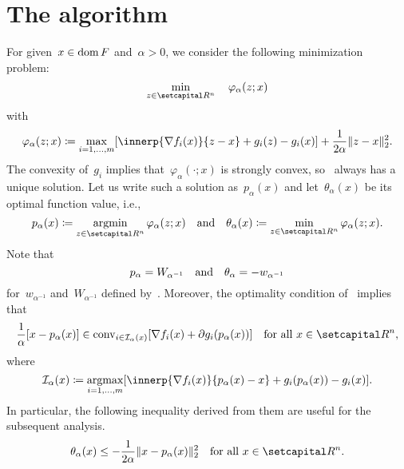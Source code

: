 \documentclass[../main]{subfiles}
\begin{document}
\section{The algorithm} 
For given~$x \in \operatorname{dom} F$ and~$\alpha > 0$, we consider the following minimization problem:
\begin{equation} \label{eq:pgm_subproblem}
    \min_{z \in \setR^n} \quad \varphi_\alpha(z; x)
\end{equation}
with
\begin{equation} \label{eq:pgm_obj}
    \varphi_\alpha(z; x) \coloneqq \max_{i = 1, \dots, m} [ \innerp{\nabla f_i(x)}{z - x} + g_i(z) - g_i(x) ] + \frac{1}{2 \alpha} \norm{ z - x }_2^2
.\end{equation}
The convexity of~$g_i$ implies that~$\varphi_\alpha(\cdot; x)$ is strongly convex, so~ always has a unique solution.
Let us write such a solution as~$p_\alpha(x)$ and let~$\theta_\alpha(x)$ be its optimal function value, i.e.,
\begin{equation} \label{eq:pgm_optimal_function}
    p_\alpha(x) \coloneqq \argmin_{z \in \setR^n} \varphi_\alpha(z; x) \eqand \theta_\alpha(x) \coloneqq \min_{z \in \setR^n} \varphi_\alpha(z; x)
.\end{equation}
Note that
\begin{equation} \label{eq:pgm_merit}
    p_\alpha = W_{\alpha^{-1}} \quad \text{and} \quad \theta_\alpha = - w_{\alpha^{-1}}
\end{equation}
for~$w_{\alpha^{-1}}$ and~$W_{\alpha^{-1}}$ defined by~.
Moreover, the optimality condition of~ implies that
\begin{equation} \label{eq:pgm_optimality}
    \frac{1}{\alpha} [ x - p_\alpha(x) ] \in \conv_{i \in \mathcal{I}_\alpha(x)} [ \nabla f_i(x) + \partial g_i(p_\alpha(x)) ] \forallcondition{x \in \setR^n}
,\end{equation} 
where
\begin{equation} \label{eq:pgm_active_set}
    \mathcal{I}_\alpha(x) \coloneqq \argmax_{i = 1, \dots, m} [ \innerp{\nabla f_i(x)}{p_\alpha(x) - x} + g_i(p_\alpha(x)) - g_i(x) ]
.\end{equation} 
In particular, the following inequality derived from them are useful for the subsequent analysis.
\begin{equation} \label{eq:pgm_optimal_function_ub}
    \theta_\alpha(x) \le - \frac{1}{2 \alpha} \norm{x - p_\alpha(x)}_2^2 \forallcondition{x \in \setR^n}
.\end{equation} 
\end{document}

